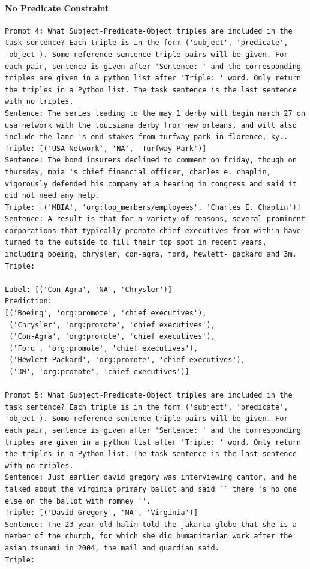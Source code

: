 \documentclass{article}
\begin{document}
\paragraph{No Predicate Constraint}
\begin{lstlisting}
Prompt 4: What Subject-Predicate-Object triples are included in the task sentence? Each triple is in the form ('subject', 'predicate', 'object'). Some reference sentence-triple pairs will be given. For each pair, sentence is given after 'Sentence: ' and the corresponding triples are given in a python list after 'Triple: ' word. Only return the triples in a Python list. The task sentence is the last sentence with no triples.
Sentence: The series leading to the may 1 derby will begin march 27 on usa network with the louisiana derby from new orleans, and will also include the lane 's end stakes from turfway park in florence, ky.. 
Triple: [('USA Network', 'NA', 'Turfway Park')]
Sentence: The bond insurers declined to comment on friday, though on thursday, mbia 's chief financial officer, charles e. chaplin, vigorously defended his company at a hearing in congress and said it did not need any help. 
Triple: [('MBIA', 'org:top_members/employees', 'Charles E. Chaplin')]
Sentence: A result is that for a variety of reasons, several prominent corporations that typically promote chief executives from within have turned to the outside to fill their top spot in recent years, including boeing, chrysler, con-agra, ford, hewlett- packard and 3m. 
Triple:

Label: [('Con-Agra', 'NA', 'Chrysler')]
Prediction: 
[('Boeing', 'org:promote', 'chief executives'),
 ('Chrysler', 'org:promote', 'chief executives'),
 ('Con-Agra', 'org:promote', 'chief executives'),
 ('Ford', 'org:promote', 'chief executives'),
 ('Hewlett-Packard', 'org:promote', 'chief executives'),
 ('3M', 'org:promote', 'chief executives')]

Prompt 5: What Subject-Predicate-Object triples are included in the task sentence? Each triple is in the form ('subject', 'predicate', 'object'). Some reference sentence-triple pairs will be given. For each pair, sentence is given after 'Sentence: ' and the corresponding triples are given in a python list after 'Triple: ' word. Only return the triples in a Python list. The task sentence is the last sentence with no triples.
Sentence: Just earlier david gregory was interviewing cantor, and he talked about the virginia primary ballot and said `` there 's no one else on the ballot with romney ''. 
Triple: [('David Gregory', 'NA', 'Virginia')]
Sentence: The 23-year-old halim told the jakarta globe that she is a member of the church, for which she did humanitarian work after the asian tsunami in 2004, the mail and guardian said. 
Triple:


\end{lstlisting}
\end{document}

